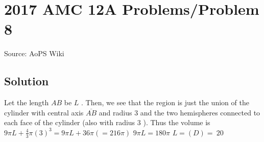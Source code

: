 \documentclass[12pt]{article}
\begin{document}
\section*{{2017 AMC 12A Problems/Problem 8}}
Source: AoPS Wiki

\subsection*{Solution}
Let the length $AB$ be $L$ . Then, we see that the region is just the union of the cylinder with central axis $\overline{AB}$ and radius $3$ and the two hemispheres connected to each face of the cylinder (also with radius $3$ ). Thus the volume is $9\pi L + \frac{4}{3}\pi(3)^3 = 9\pi L + 36\pi ( = 216\pi)$ $9\pi L = 180\pi$ $L = \boxed{(D)=\ 20}$
\end{document}
